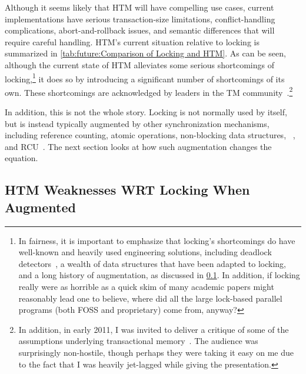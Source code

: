 

Although it seems likely that HTM will have compelling use cases,
current implementations have serious transaction-size limitations,
conflict-handling complications, abort-and-rollback issues, and
semantic differences that will require careful handling.
HTM's current situation relative to locking is summarized in
\cref{tab:future:Comparison of Locking and HTM}.
As can be seen, although the current state of HTM alleviates some
serious shortcomings of locking,\footnote{
	In fairness, it is important to emphasize that locking's shortcomings
	do have well-known and heavily used engineering solutions, including
	deadlock detectors~\cite{JonathanCorbet2006lockdep}, a wealth
	of data structures that have been adapted to locking, and
	a long history of augmentation, as discussed in
	\cref{sec:future:HTM Weaknesses WRT Locking When Augmented}.
	In addition, if locking really were as horrible as a quick skim
	of many academic papers might reasonably lead one to believe,
	where did all the large lock-based parallel programs (both
	FOSS and proprietary) come from, anyway?}
it does so by introducing a significant
number of shortcomings of its own.
These shortcomings are acknowledged by leaders in the TM
community~\cite{AlexanderMatveev2012PessimisticTM}.\footnote{
	In addition, in early 2011, I was invited to deliver a critique of
	some of the assumptions underlying transactional
	memory~\cite{PaulEMcKenney2011Verico}.
	The audience was surprisingly non-hostile, though perhaps they
	were taking it easy on me due to the fact that I was heavily
	jet-lagged while giving the presentation.}

In addition, this is not the whole story.
Locking is not normally used by itself, but is instead typically
augmented by other synchronization mechanisms,
including reference counting, atomic operations, non-blocking data structures,
~\cite{MagedMichael04a,HerlihyLM02},
and RCU~\cite{McKenney98,McKenney01a,ThomasEHart2007a,PaulEMcKenney2012ELCbattery}.
The next section looks at how such augmentation changes the equation.

\subsection{HTM Weaknesses WRT Locking When Augmented}
\label{sec:future:HTM Weaknesses WRT Locking When Augmented}



